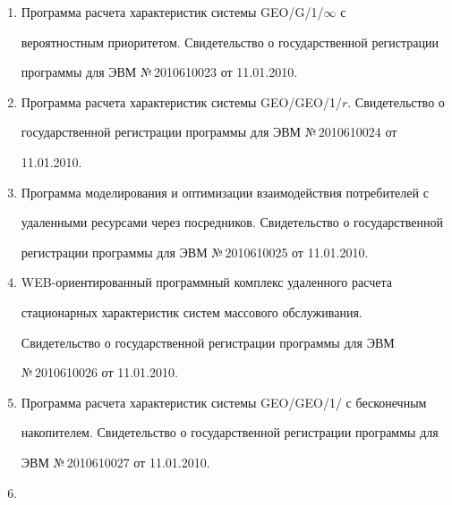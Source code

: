  \begin{enumerate}[1.]


\item {}


Программа расчета характеристик сис\-темы GEO/G/1/$\infty$ с 


вероятностным приоритетом. Свидетельство о государственной регистрации 


программы для ЭВМ №\,2010610023 от 11.01.2010.


\item {}


Программа расчета характеристик сис\-темы GEO/GEO/1/$r$. Свидетельство о 


государственной регистрации программы для ЭВМ №\,2010610024 от 


11.01.2010.


\item {}


Программа моделирования и оптимизации взаимодействия потребителей с 


удаленными ресурсами через посредников. Свидетельство о государственной 


регистрации программы для ЭВМ №\,2010610025 от 11.01.2010.


\item {}


WEB-ориен\-ти\-ро\-ван\-ный программный комплекс удаленного расчета 


стационарных характеристик сис\-тем массового обслуживания. 


Свидетельство о государственной регистрации программы для ЭВМ 


№\,2010610026 от 11.01.2010.


\item {}


Программа расчета характеристик сис\-темы GEO/GEO/1/ с бесконечным 


накопителем. Свидетельство о государственной регистрации программы для 


ЭВМ №\,2010610027 от 11.01.2010.


\item {}



\end{enumerate}
